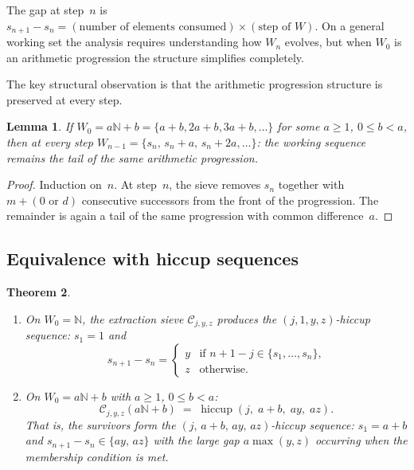 \documentclass[11pt]{article}
\numberwithin{equation}{section}
\theoremstyle{plain}
\newtheorem{theorem}{Theorem}[section]
\newtheorem{lemma}[theorem]{Lemma}
\theoremstyle{definition}
\theoremstyle{remark}
\newcommand{\N}{\mathbb{N}}
\begin{document}
The gap at step~$n$ is $s_{n+1}-s_n=(\text{number of elements
consumed})\times(\text{step of } W)$.  On a general working set the
analysis requires understanding how $W_n$ evolves, but when $W_0$ is
an arithmetic progression the structure simplifies completely.

The key structural observation is that the arithmetic progression structure is preserved at every step.

\begin{lemma}\label{lem:interval}
If $W_0=a\N+b=\{a+b,2a+b,3a+b,\ldots\}$ for some $a\ge1$, $0\le b<a$,
then at every step $W_{n-1}=\{s_n,\,s_n+a,\,s_n+2a,\ldots\}$:
the working sequence remains the tail of the same arithmetic
progression.
\end{lemma}

\begin{proof}
Induction on~$n$.  At step~$n$, the sieve removes $s_n$ together with
$m+(0\text{ or }d)$ consecutive successors from the front
of the progression.  The remainder is again a tail of the same progression with
common difference~$a$.
\end{proof}

\subsection{Equivalence with hiccup sequences}

\begin{theorem}\label{thm:extr-hiccup}
\leavevmode
\begin{enumerate}
\item[\textup{(a)}]
  On $W_0=\N$, the extraction sieve $\mathcal{C}_{j,y,z}$ produces
  the $(j,1,y,z)$-hiccup sequence: $s_1=1$ and
  \begin{equation}\label{eq:extr-hiccup}
    s_{n+1}-s_n=
    \begin{cases}
      y & \text{if $n+1-j\in\{s_1,\ldots,s_n\}$,}\\
      z & \text{otherwise.}
    \end{cases}
  \end{equation}
\item[\textup{(b)}]
  On $W_0=a\N+b$ with $a\ge1$, $0\le b<a$:
  \begin{equation}\label{eq:extr-affine}
    \mathcal{C}_{j,y,z}(a\N+b)\;=\;\operatorname{hiccup}(j,\;a+b,\;ay,\;az).
  \end{equation}
  That is, the survivors form the $(j,\,a+b,\,ay,\,az)$-hiccup
  sequence: $s_1=a+b$ and
  $s_{n+1}-s_n\in\{ay,\,az\}$ with the large gap $a\max(y,z)$
  occurring when the membership condition is met.
\end{enumerate}
\end{theorem}
\end{document}
